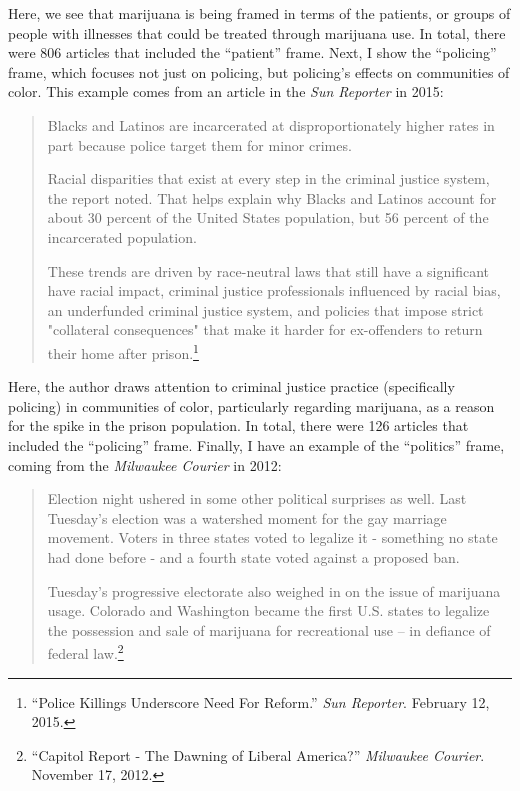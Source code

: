 Here, we see that marijuana is being framed in terms of the patients, or groups of people with illnesses that could be treated through marijuana use. In total, there were 806 articles that included the ``patient'' frame. Next, I show the ``policing'' frame, which focuses not just on policing, but policing's effects on communities of color. This example comes from an article in the \textit{Sun Reporter} in 2015:


\begin{quotation}
\begin{singlespace}
\noindent Blacks and Latinos are incarcerated at disproportionately higher rates in part because police target them for minor crimes. \newline

\noindent Racial disparities that exist at every step in the criminal justice system, the report noted. That helps explain why Blacks and Latinos account for about 30 percent of the United States population, but 56 percent of the incarcerated population. \newline


\noindent These trends are driven by race-neutral laws that still have a significant have racial impact, criminal justice professionals influenced by racial bias, an underfunded criminal justice system, and policies that impose strict "collateral consequences" that make it harder for ex-offenders to return their home after prison.\footnote{``Police Killings Underscore Need For Reform.'' \textit{Sun Reporter}. February 12, 2015.}
\end{singlespace}
\end{quotation}

Here, the author draws attention to criminal justice practice (specifically policing) in communities of color, particularly regarding marijuana, as a reason for the spike in the prison population. In total, there were 126 articles that included the ``policing'' frame. Finally, I have an example of the ``politics'' frame, coming from the \textit{Milwaukee Courier} in 2012:


\begin{quotation}
\begin{singlespace}
\noindent Election night ushered in some other political surprises as well. Last Tuesday's election was a watershed moment for the gay marriage movement. Voters in three states voted to legalize it - something no state had done before - and a fourth state voted against a proposed ban.\newline

\noindent Tuesday's progressive electorate also weighed in on the issue of marijuana usage. Colorado and Washington became the first U.S. states to legalize the possession and sale of marijuana for recreational use -- in defiance of federal law.\footnote{``Capitol Report - The Dawning of Liberal America?'' \textit{Milwaukee Courier}. November 17, 2012.}
\end{singlespace}
\end{quotation}

